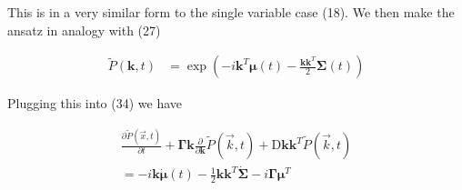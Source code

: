 \documentclass{article}
\begin{document}
This is in a very similar form to the single variable case (18). We then make the ansatz in analogy with (27)

\begin{align}
\tilde{P}(\bm{k},t) &= \exp\left(-i \bm{k}^{T} \bm{\mu}(t) -\frac{\bm{k}\bm{k}^{T}}{2}\bm{\Sigma}(t)\right)
\end{align}

Plugging this into (34) we have

\begin{align}
\frac{\partial \tilde{P}(\vec{x},t)}{\partial t}+ \bm{\Gamma}\bm{k}\frac{\partial}{\partial \bm{k}} \tilde{P}(\vec{k},t) + \bm{\mathrm{D}}\bm{k}\bm{k}^{T}\tilde{P}(\vec{k},t)\\
= -i\bm{k}\dot{\bm\mu}(t) - \frac{1}{2}\bm{k}\bm{k}^{T}\dot{\bm\Sigma}-i\bm\Gamma \bm\mu^{T}
\end{align}
\end{document}
